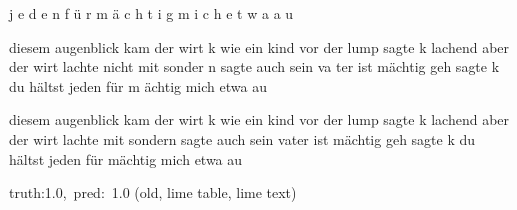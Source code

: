 \documentclass[a4paper,10pt,twoside]{article}
\begin{document}
{\color[rgb]{0.0,0,0} j}{\color[rgb]{0.044,0,0} e}{\color[rgb]{0.078,0,0} d}{\color[rgb]{0.091,0,0} e}{\color[rgb]{0.635,0,0} n} {\color[rgb]{0.035,0,0} f}{\color[rgb]{0.319,0,0} ü}{\color[rgb]{0.522,0,0} r} {\color[rgb]{0.454,0,0} m}{\color[rgb]{1,0,0} ä}{\color[rgb]{1,0,0} c}{\color[rgb]{0.395,0,0} h}{\color[rgb]{0.0,0,0} t}{\color[rgb]{0.0,0,0} i}{\color[rgb]{0.0,0,0} g} {\color[rgb]{0.0,0,0} m}{\color[rgb]{0.0,0,0} i}{\color[rgb]{0.796,0,0} c}{\color[rgb]{0.184,0,0} h} {\color[rgb]{1,0,0} e}{\color[rgb]{1,0,0} t}{\color[rgb]{1,0,0} w}{\color[rgb]{0.948,0,0} a} {\color[rgb]{0.0,0,0} a}{\color[rgb]{0.0,0,0} u}

diesem augenblick kam der wirt k wie ein kind vor der lump sagte k lachend aber der wirt lachte nicht mit sonder{\color[rgb]{1,0,0} n} sagte auch sein va{\color[rgb]{1,0,0} t}er ist mächtig geh sagte k du hältst jeden für m{\color[rgb]{1,0,0} ä}chtig mich etwa au

 diesem augenblick kam der {\color[rgb]{1,0,0} wirt} k wie ein kind vor der lump sagte k lachend aber der {\color[rgb]{1,0,0} wirt} {\color[rgb]{1,0,0} lachte}  mit sondern sagte auch sein {\color[rgb]{1,0,0} vater} ist {\color[rgb]{0,0,1} mächtig} geh sagte k du hältst jeden für {\color[rgb]{0,0,1} mächtig} mich etwa au

 {\footnotesize {\color[rgb]{0.6, 0.6, 0.6}truth:1.0,~pred:~1.0}} (old, lime table, lime text)\hrulefill
\end{document}

